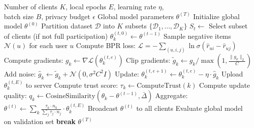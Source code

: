 \begin{algorithm}[htbp]
\caption{Federated Training Workflow for T-FedMMG}
\label{alg:federated_training}
\begin{algorithmic}[1]
\REQUIRE Number of clients $K$, local epochs $E$, learning rate $\eta$, \\
\quad batch size $B$, privacy budget $\epsilon$
\ENSURE Global model parameters $\theta^{(T)}$
\STATE Initialize global model $\theta^{(0)}$
\STATE Partition dataset $\mathcal{D}$ into $K$ subsets $\{\mathcal{D}_1, \ldots, \mathcal{D}_K\}$
    \STATE $S_t \leftarrow$ Select subset of clients (if not full participation)
        \STATE $\theta_k^{(t,0)} \leftarrow \theta^{(t-1)}$ \quad {}
                \STATE Sample negative items $\mathcal{N}(u)$ for each user $u$
                \STATE Compute BPR loss: $\mathcal{L} = -\sum_{(u,i,j)} \ln \sigma(\hat{r}_{ui} - \hat{r}_{uj})$
                \STATE Compute gradients: $g_k \leftarrow \nabla \mathcal{L}(\theta_k^{(t,e)})$
                \STATE Clip gradients: $\tilde{g}_k \leftarrow g_k / \max(1, \frac{\|g_k\|_2}{C})$
                \STATE Add noise: $\hat{g}_k \leftarrow \tilde{g}_k + \mathcal{N}(0, \sigma^2 C^2 I)$
                \STATE Update: $\theta_k^{(t,e+1)} \leftarrow \theta_k^{(t,e)} - \eta \cdot \hat{g}_k$
            \ENDFOR
        \ENDFOR
        \STATE Upload $\theta_k^{(t,E)}$ to server
    \ENDFOR
    \STATE {}
        \STATE Compute trust score: $\tau_k \leftarrow \text{ComputeTrust}(k)$
        \STATE Compute update quality: $q_k \leftarrow \text{CosineSimilarity}(\theta_k - \theta^{(t-1)}, \bar{\Delta})$
    \ENDFOR
    \STATE Aggregate: $\theta^{(t)} \leftarrow \sum_{k} \frac{\tau_k \cdot n_k}{\sum_j \tau_j \cdot n_j} \cdot \theta_k^{(t,E)}$
    \STATE Broadcast $\theta^{(t)}$ to all clients
    \STATE Evaluate global model on validation set
        \STATE \textbf{break}
    \ENDIF
\ENDFOR
\RETURN $\theta^{(T)}$
\end{algorithmic}
\end{algorithm}


